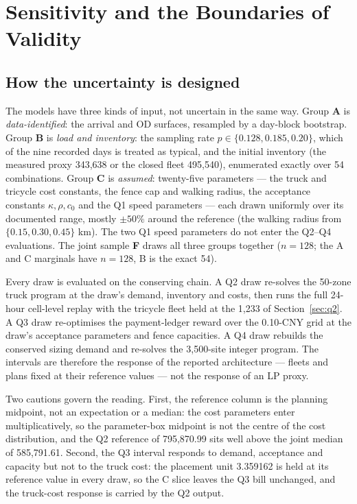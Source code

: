 \section{Sensitivity and the Boundaries of Validity}\label{sec:sens}

\subsection{How the uncertainty is designed}

The models have three kinds of input, not uncertain in the same way. Group
\textbf{A} is \emph{data-identified}: the arrival and OD surfaces, resampled by a
day-block bootstrap. Group \textbf{B} is \emph{load and inventory}: the sampling rate
$p\in\{0.128,0.185,0.20\}$, which of the nine recorded days is treated as typical, and
the initial inventory (the measured proxy 343,638 or the closed fleet 495,540),
enumerated exactly over 54 combinations. Group \textbf{C} is \emph{assumed}:
twenty-five parameters --- the truck and tricycle cost constants, the fence cap and
walking radius, the acceptance constants $\kappa,\rho,c_0$ and the Q1 speed parameters
--- each drawn uniformly over its documented range, mostly $\pm50\%$ around the
reference (the walking radius from $\{0.15,0.30,0.45\}$ km). The two Q1 speed parameters
do not enter the Q2--Q4 evaluations. The joint sample \textbf{F} draws all three groups
together ($n=128$; the A and C marginals have $n=128$, B is the exact 54).

Every draw is evaluated on the conserving chain. A Q2 draw
re-solves the 50-zone truck program at the draw's demand, inventory and costs, then runs
the full 24-hour cell-level replay with the tricycle fleet held at the 1,233 of
Section~\ref{sec:q2}. A Q3 draw re-optimises the payment-ledger reward over the
0.10-CNY grid at the draw's acceptance parameters and fence capacities. A Q4 draw
rebuilds the conserved sizing demand and re-solves the 3,500-site integer program. The
intervals are therefore the response of the reported architecture --- fleets and plans
fixed at their reference values --- not the response of an LP proxy.

Two cautions govern the reading. First, the reference column is the planning midpoint,
not an expectation or a median: the cost parameters enter multiplicatively, so the
parameter-box midpoint is not the centre of the cost distribution, and the Q2 reference
of 795,870.99 sits well above the joint median of 585,791.61. Second, the Q3 interval
responds to demand, acceptance and capacity but not to the truck cost: the placement
unit 3.359162 is held at its reference value in every draw, so the C slice leaves the Q3
bill unchanged, and the truck-cost response is carried by the Q2 output.

